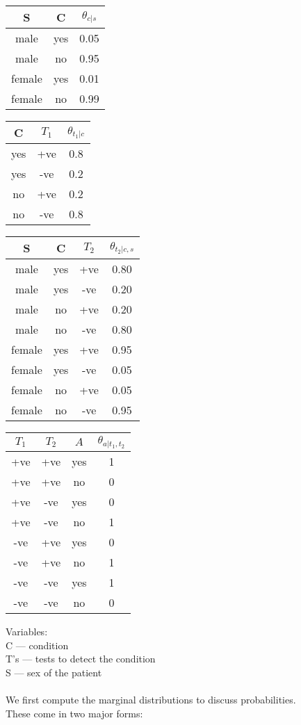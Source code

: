 \documentclass[../../lecture_notes.tex]{subfiles}
\begin{document}
\begin{center}\begin{tabular} { | c c | c | } \hline
	S & C & $\theta_{c|s}$ \\\hline 
	male & yes & 0.05 \\
	male & no & 0.95 \\
	female & yes & 0.01 \\
	female & no & 0.99
\\\hline\end{tabular}
\begin{tabular} { | c c | c | } \hline
	C & $T_1$ & $\theta_{t_1|c}$ \\\hline 
	yes & +ve & 0.8 \\
	yes & -ve & 0.2 \\
	no & +ve & 0.2 \\
	no & -ve & 0.8
\\\hline\end{tabular}
\begin{tabular} { | c c c | c | } \hline
	S & C & $T_2$ & $\theta_{t_2|c,s}$ \\\hline 
	male & yes & +ve & 0.80 \\
	male & yes & -ve & 0.20 \\
	male & no & +ve & 0.20 \\
	male & no & -ve & 0.80 \\
	female & yes & +ve & 0.95 \\
	female & yes & -ve & 0.05 \\
	female & no & +ve & 0.05 \\
	female & no & -ve & 0.95
\\\hline\end{tabular}
\begin{tabular} { | c c c | c | } \hline
	$T_1$ & $T_2$ & $A$ & $\theta_{a|t_1,t_2}$ \\\hline 
	+ve & +ve & yes & 1 \\
	+ve & +ve & no & 0 \\
	+ve & -ve & yes & 0 \\
	+ve & -ve & no & 1 \\
	-ve & +ve & yes & 0 \\
	-ve & +ve & no & 1 \\
	-ve & -ve & yes & 1 \\
	-ve & -ve & no & 0
\\\hline\end{tabular}\end{center}
\noindent Variables:\\
	\indent C — condition\\
	\indent T’s — tests to detect the condition\\
	\indent S — sex of the patient\\
\\
We first compute the marginal distributions to discuss probabilities.\\
These come in two major forms:
\end{document}
